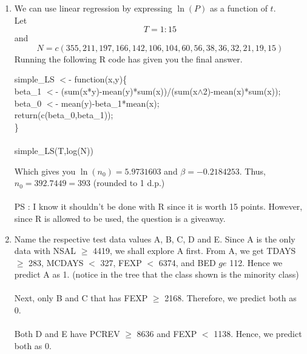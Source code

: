 \documentclass{article}
\begin{document}
\begin{enumerate}
    \item We can use linear regression by expressing $\ln(P)$ as a function of $t$.\\
    Let \[T=1:15\]
    and \[N=c(355,211,197,166,142,106,104,60,56,38,36,32,21,19,15)\]
    Running the following R code has given you the final answer.\\
    \begin{tcolorbox}[colback=blue!10, colframe=blue]
    simple\_LS $<$- function(x,y)\{\\
    \hspace{1 cm}beta\_1 $<$- (sum(x*y)-mean(y)*sum(x))/(sum(x$\wedge$2)-mean(x)*sum(x));\\
	\hspace{5 mm}beta\_0 $<$- mean(y)-beta\_1*mean(x);\\
	\hspace{5 mm}return(c(beta\_0,beta\_1));\\
    \}\\\\
    simple\_LS(T,log(N))
    \end{tcolorbox}
    Which gives you $\ln(n_0)=5.9731603$ and $\beta=-0.2184253$. Thus, $n_0=392.7449=393$ (rounded to 1 d.p.)\\\\
    PS : I know it shouldn't be done with R since it is worth 15 points. However, since R is allowed to be used, the question is a giveaway.
    
    \item Name the respective test data values A, B, C, D and E. Since A is the only data with NSAL $\ge$ 4419, we shall explore A first. From A, we get TDAYS $\ge$ 283, MCDAYS $<$ 327, FEXP $<$ 6374, and BED $ge$ 112. Hence we predict A as 1. (notice in the tree that the class shown is the minority class)\\\\
    Next, only B and C that has FEXP $\ge$ 2168. Therefore, we predict both as 0.\\\\
    Both D and E have PCREV $\ge$ 8636 and FEXP $<$ 1138. Hence, we predict both as 0.
    

\end{enumerate}
\end{document}
